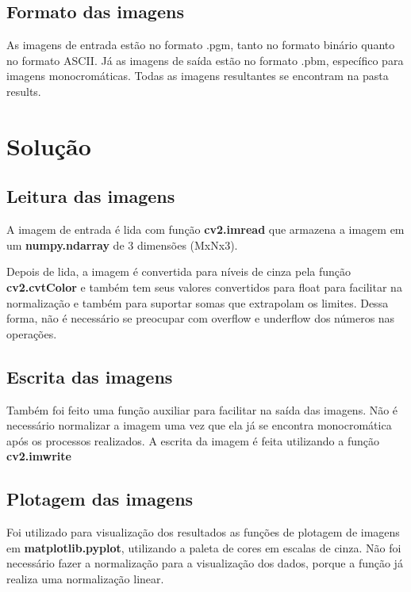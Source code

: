 \documentclass{article}
\begin{document}
\subsection{Formato das imagens}

As imagens de entrada estão no formato .pgm, tanto no formato binário quanto no formato ASCII. Já as imagens de saída estão no formato .pbm, específico para imagens monocromáticas. Todas as imagens resultantes se encontram na pasta results.

\section{Solução}

\subsection{Leitura das imagens}

A imagem de entrada é lida com função \textbf{cv2.imread} que armazena a imagem em um \textbf{numpy.ndarray} de 3 dimensões (MxNx3).

Depois de lida, a imagem é convertida para níveis de cinza pela função \textbf{cv2.cvtColor} e também tem seus valores convertidos para float para facilitar na normalização e também para suportar somas que extrapolam os limites. Dessa forma, não é necessário se preocupar com overflow e underflow dos números nas operações.

\subsection{Escrita das imagens}

Também foi feito uma função auxiliar para facilitar na saída das imagens. Não é necessário normalizar a imagem uma vez que ela já se encontra monocromática após os processos realizados. A escrita da imagem é feita utilizando a função \textbf{cv2.imwrite} 

\subsection{Plotagem das imagens}

Foi utilizado para visualização dos resultados as funções de plotagem de imagens em \textbf{matplotlib.pyplot}, utilizando a paleta de cores em escalas de cinza. Não foi necessário fazer a normalização para a visualização dos dados, porque a função já realiza uma normalização linear.
\end{document}
